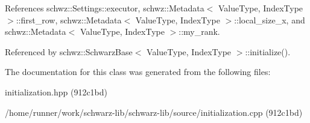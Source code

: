 References schwz\+::\+Settings\+::executor, schwz\+::\+Metadata$<$ Value\+Type, Index\+Type $>$\+::first\+\_\+row, schwz\+::\+Metadata$<$ Value\+Type, Index\+Type $>$\+::local\+\_\+size\+\_\+x, and schwz\+::\+Metadata$<$ Value\+Type, Index\+Type $>$\+::my\+\_\+rank.



Referenced by schwz\+::\+Schwarz\+Base$<$ Value\+Type, Index\+Type $>$\+::initialize().



The documentation for this class was generated from the following files\+:\begin{DoxyCompactItemize}
\item 
initialization.\+hpp (912c1bd)\item 
/home/runner/work/schwarz-\/lib/schwarz-\/lib/source/initialization.\+cpp (912c1bd)\end{DoxyCompactItemize}
